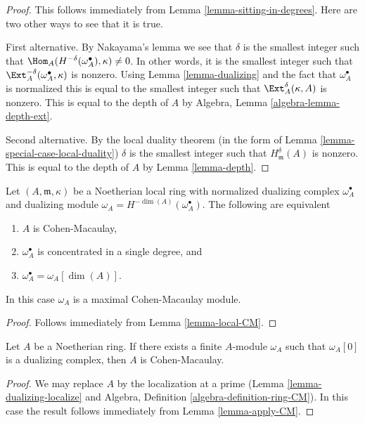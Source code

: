 \begin{proof}
This follows immediately from
Lemma \ref{lemma-sitting-in-degrees}.
Here are two other ways to see that it is true.

\medskip\noindent
First alternative. By Nakayama's lemma we see that
$\delta$ is the smallest integer such that
$\Hom_A(H^{-\delta}(\omega_A^\bullet), \kappa) \not = 0$.
In other words, it is the smallest integer such that
$\Ext_A^{-\delta}(\omega_A^\bullet, \kappa)$
is nonzero. Using Lemma \ref{lemma-dualizing} and the fact that
$\omega_A^\bullet$ is normalized this is equal to the
smallest integer such that $\Ext_A^\delta(\kappa, A)$ is
nonzero. This is equal to the depth of $A$ by
Algebra, Lemma \ref{algebra-lemma-depth-ext}.

\medskip\noindent
Second alternative. By the local duality theorem
(in the form of Lemma \ref{lemma-special-case-local-duality})
$\delta$ is the smallest integer such that $H^\delta_\mathfrak m(A)$
is nonzero. This is equal to the depth of $A$ by
Lemma \ref{lemma-depth}.
\end{proof}

\begin{lemma}
\label{lemma-apply-CM}
Let $(A, \mathfrak m, \kappa)$ be a Noetherian local ring
with normalized dualizing complex $\omega_A^\bullet$
and dualizing module $\omega_A = H^{-\dim(A)}(\omega_A^\bullet)$.
The following are equivalent
\begin{enumerate}
\item $A$ is Cohen-Macaulay,
\item $\omega_A^\bullet$ is concentrated in a single degree, and
\item $\omega_A^\bullet = \omega_A[\dim(A)]$.
\end{enumerate}
In this case $\omega_A$ is a maximal Cohen-Macaulay module.
\end{lemma}

\begin{proof}
Follows immediately from Lemma \ref{lemma-local-CM}.
\end{proof}

\begin{lemma}
\label{lemma-has-dualizing-module-CM}
Let $A$ be a Noetherian ring. If there exists a finite $A$-module
$\omega_A$ such that $\omega_A[0]$ is a dualizing complex, then
$A$ is Cohen-Macaulay.
\end{lemma}

\begin{proof}
We may replace $A$ by the localization at a prime
(Lemma \ref{lemma-dualizing-localize} and
Algebra, Definition \ref{algebra-definition-ring-CM}).
In this case the result follows immediately from
Lemma \ref{lemma-apply-CM}.
\end{proof}

